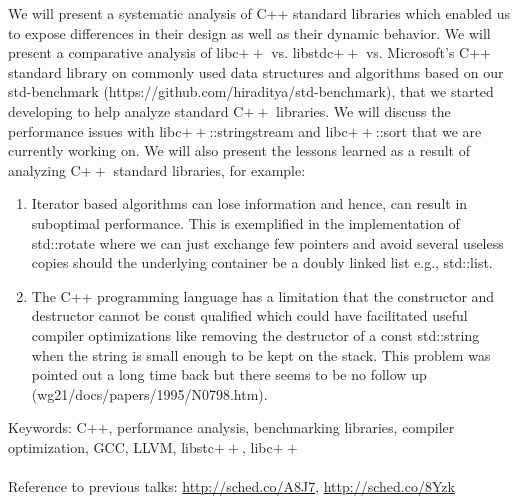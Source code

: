 \documentclass[10pt]{article}
\begin{document}
We will present a systematic analysis of C++ standard libraries which enabled us
to expose differences in their design as well as their dynamic behavior. We will
present a comparative analysis of libc$++$ vs. libstdc$++$ vs. Microsoft's C++
standard library on commonly used data structures and algorithms based on our
std-benchmark (https://github.com/hiraditya/std-benchmark), that we started
developing to help analyze standard C$++$ libraries. We will discuss the
performance issues with libc$++$::stringstream and libc$++$::sort that we are
currently working on. We will also present the lessons learned as a result of
analyzing C$++$ standard libraries, for example:
\begin{enumerate}
\item Iterator based algorithms can lose information and hence, can result in
  suboptimal performance.  This is exemplified in the implementation of
  std::rotate where we can just exchange few pointers and avoid several useless
  copies should the underlying container be a doubly linked list e.g.,
  std::list.
\item The C++ programming language has a limitation that the constructor and
  destructor cannot be const qualified which could have facilitated useful
  compiler optimizations like removing the destructor of a const std::string
  when the string is small enough to be kept on the stack. This problem was
  pointed out a long time back but there seems to be no follow up
  (wg21/docs/papers/1995/N0798.htm).
\end{enumerate}

Keywords: C++, performance analysis, benchmarking libraries, compiler
optimization, GCC, LLVM, libstc$++$, libc$++$
\\
\\
Reference to previous talks: \url{http://sched.co/A8J7}, \url{http://sched.co/8Yzk}
\end{document}

